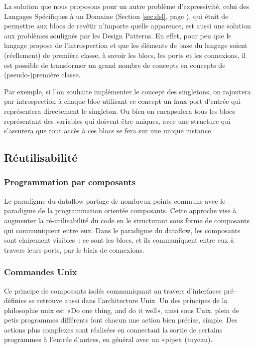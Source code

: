 \documentclass{article}
\begin{document}
La solution que nous proposons pour un autre problème d'expressivité, celui des Langages Spécifiques à un Domaine (Section \ref{sec:dsl},
page \pageref{sec:dsl}), qui était de permettre aux blocs de revêtir n'importe quelle apparence, est aussi une solution aux problèmes
soulignés par les Design Patterns. En effet, pour peu que le langage propose de l'introspection et que les éléments de base du langage
soient (réellement) de première classe, à savoir les blocs, les ports et les connexions, il est possible de transformer un grand nombre de
concepts en concepts de (pseudo-)première classe.

Par exemple, si l'on souhaite implémenter le concept des singletons, on rajoutera par introspection à chaque bloc utilisant ce concept un
faux port d'entrée qui représentera directement le singleton. Ou bien on encapsulera tous les blocs représentant des variables qui doivent
être uniques, avec une structure qui s'assurera que tout accès à ces blocs se fera sur une unique instance.

\subsection{Réutilisabilité}

\subsubsection{Programmation par composants}

Le paradigme du dataflow partage de nombreux points communs avec le paradigme de la programmation orientée composants. Cette approche vise à
augmenter la ré-utilisabilité du code en le structurant sous forme de composants qui communiquent entre eux. Dans le paradigme du dataflow,
les composants sont clairement visibles~: ce sont les blocs, et ils communiquent entre eux à travers leurs ports, par le biais de
connexions.

\subsubsection{Commandes Unix}

Ce principe de composants isolés communiquant au travers d'interfaces pré-définies se retrouve aussi dans l'architecture Unix. Un des
principes de la philosophie unix est «Do one thing, and do it well», ainsi sous Unix, plein de petis programmes différents font chacun une
action bien précise, simple. Des actions plus complexes sont réalisées en connectant la sortie de certains programmes à l'entrée d'autres,
en général avec un «pipe» (tuyeau).
\end{document}
